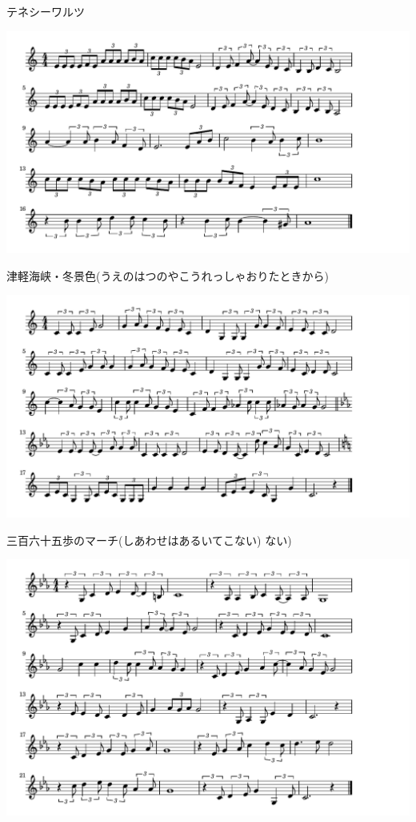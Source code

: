 \documentclass[a4paper]{ltjsarticle}
\begin{document}
\vspace{-10mm} \hspace{10mm}
テネシーワルツ

\includegraphics[clip]{tsugaru_crop.pdf}

\vspace{-10mm} \hspace{10mm}
津軽海峡・冬景色(うえのはつのやこうれっしゃおりたときから)

\includegraphics[clip]{sanbyaku65_crop.pdf}

\vspace{-10mm} \hspace{10mm}
三百六十五歩のマーチ(しあわせはあるいてこない)
ない)

\includegraphics[clip]{wakarenoblues_crop.pdf}
\end{document}
